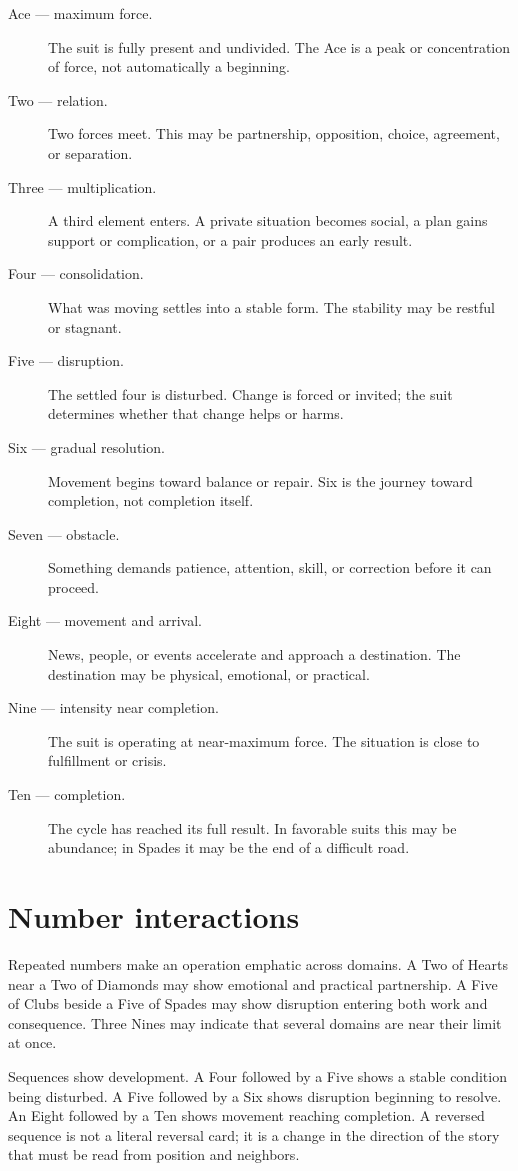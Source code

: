 \begin{description}
\item[Ace --- maximum force.] The suit is fully present and undivided. The Ace
  is a peak or concentration of force, not automatically a beginning.
\item[Two --- relation.] Two forces meet. This may be partnership, opposition,
  choice, agreement, or separation.
\item[Three --- multiplication.] A third element enters. A private situation
  becomes social, a plan gains support or complication, or a pair produces an
  early result.
\item[Four --- consolidation.] What was moving settles into a stable form. The
  stability may be restful or stagnant.
\item[Five --- disruption.] The settled four is disturbed. Change is forced or
  invited; the suit determines whether that change helps or harms.
\item[Six --- gradual resolution.] Movement begins toward balance or repair.
  Six is the journey toward completion, not completion itself.
\item[Seven --- obstacle.] Something demands patience, attention, skill, or
  correction before it can proceed.
\item[Eight --- movement and arrival.] News, people, or events accelerate and
  approach a destination. The destination may be physical, emotional, or
  practical.
\item[Nine --- intensity near completion.] The suit is operating at near-maximum
  force. The situation is close to fulfillment or crisis.
\item[Ten --- completion.] The cycle has reached its full result. In favorable
  suits this may be abundance; in Spades it may be the end of a difficult road.
\end{description}

\section{Number interactions}

Repeated numbers make an operation emphatic across domains. A Two of Hearts
near a Two of Diamonds may show emotional and practical partnership. A Five of
Clubs beside a Five of Spades may show disruption entering both work and
consequence. Three Nines may indicate that several domains are near their limit
at once.

Sequences show development. A Four followed by a Five shows a stable condition
being disturbed. A Five followed by a Six shows disruption beginning to resolve.
An Eight followed by a Ten shows movement reaching completion. A reversed
sequence is not a literal reversal card; it is a change in the direction of the
story that must be read from position and neighbors.

